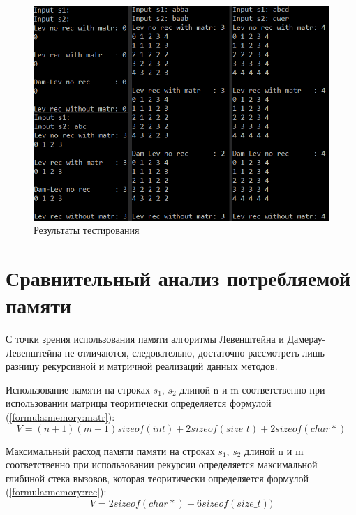         \begin{figure}[h!]
            \centering
            \includegraphics[scale=1.2]{img/testing}
            \caption{Результаты тестирования}
            \label{png:testing:result}
        \end{figure}

    \section{Сравнительный анализ потребляемой памяти}  
        С точки зрения использования памяти алгоритмы Левенштейна и
        Дамерау-Левенштейна не отличаются, следовательно, достаточно
        рассмотреть лишь разницу рекурсивной и матричной реализаций
        данных методов.
        
        Использование памяти на строках $s_1$, $s_2$ длиной n и m соответственно
        при использовании матрицы теоритически определяется формулой (\ref{formula:memory:matr}):
        \begin{equation}
            V = (n + 1)(m + 1)sizeof(int) + 2sizeof(size\_t) + 2sizeof(char*)
            \label{formula:memory:matr}
        \end{equation}
        

        Максимальный расход памяти памяти на строках $s_1$, $s_2$ длиной n и m соответственно
        при использовании рекурсии определяется максимальной глибиной стека вызовов,
        которая теоритически определяется формулой (\ref{formula:memory:rec}):
        \begin{equation}
            V = 2sizeof(char*) + 6sizeof(size\_t))
            \label{formula:memory:rec}
        \end{equation}
\newpage